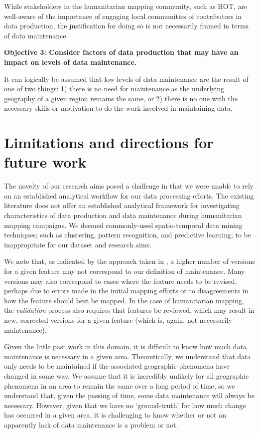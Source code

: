 While stakeholders in the humanitarian mapping community, such as HOT, are well-aware of the importance of engaging local communities of contributors in data production, the justification for doing so is not necessarily framed in terms of data maintenance. 

\noindent\textbf{Objective 3: Consider factors of data production that may have an impact on levels of data maintenance.}

It can logically be assumed that low levels of data maintenance are the result of one of two things: 1) there is no need for maintenance as the underlying geography of a given region remains the same, or 2) there is no one with the necessary skills or motivation to do the work involved in maintaining data. 


\section{Limitations and directions for future work}

The novelty of our research aims posed a challenge in that we were unable to rely on an established analytical workflow for our data processing efforts. The existing literature does not offer an established analytical framework for investigating characteristics of data production and data maintenance during humanitarian mapping campaigns. We deemed commonly-used spatio-temporal data mining techniques; such as clustering, pattern recognition, and predictive learning; to be inappropriate for our dataset and research aims. 

We note that, as indicated by the approach taken in \textcite{mooney_characteristics_2012}, a higher number of versions for a given feature may not correspond to our definition of maintenance. Many versions may also correspond to cases where the feature needs to be revised, perhaps due to errors made in the initial mapping efforts or to disagreements in how the feature should best be mapped. In the case of humanitarian mapping, the \textit{validation} process also requires that features be reviewed, which may result in new, corrected versions for a given feature (which is, again, not necessarily maintenance). 

Given the little past work in this domain, it is difficult to know how much data maintenance is necessary in a given area. Theoretically, we understand that data only needs to be maintained if the associated geographic phenomena have changed in some way. We assume that it is incredibly unlikely for all geographic phenomena in an area to remain the same over a long period of time, so we understand that, given the passing of time, some data maintenance will always be necessary. However, given that we have no ‘ground-truth’ for how much change has occurred in a given area, it is challenging to know whether or not an apparently lack of data maintenance is a problem or not.  


